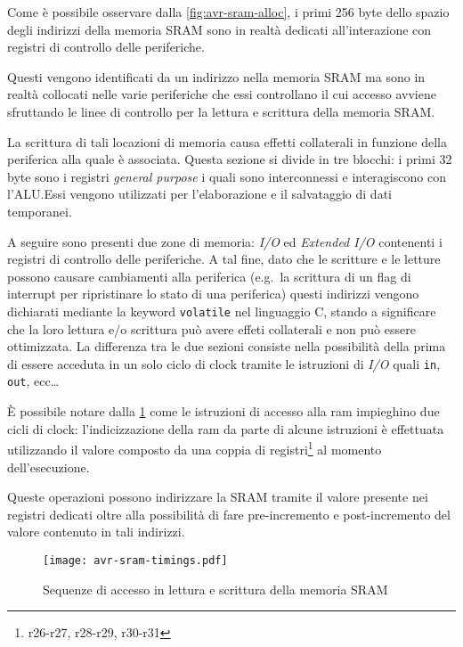 Come è possibile osservare dalla \cref{fig:avr-sram-alloc}, i primi 256 byte dello spazio degli indirizzi della memoria SRAM sono in realtà dedicati all'interazione con registri di controllo delle periferiche.

Questi vengono identificati da un indirizzo nella memoria SRAM ma sono in realtà collocati nelle varie periferiche che essi controllano il cui accesso avviene sfruttando le linee di controllo per la lettura e scrittura della memoria SRAM\cite[fig 14-2]{avr:m328p}.

La scrittura di tali locazioni di memoria causa effetti collaterali in funzione della periferica alla quale è associata. Questa sezione si divide in tre blocchi: i primi 32 byte sono i registri \textit{general purpose} i quali sono interconnessi e interagiscono con l'ALU.\@ Essi vengono utilizzati per l'elaborazione e il salvataggio di dati temporanei.

A seguire sono presenti due zone di memoria: \textit{I/O} ed \textit{Extended I/O} contenenti i registri di controllo delle periferiche. A tal fine, dato che le scritture e le letture possono causare cambiamenti alla periferica (e.g.\ la scrittura di un flag di interrupt per ripristinare lo stato di una periferica) questi indirizzi vengono dichiarati mediante la keyword \texttt{volatile} nel linguaggio C, stando a significare che la loro lettura e/o scrittura può avere effeti collaterali e non può essere ottimizzata. La differenza tra le due sezioni consiste nella possibilità della prima di essere acceduta in un solo ciclo di clock tramite le istruzioni di \textit{I/O}\cite[sec 8.5]{avr:m328p} quali \texttt{in}, \texttt{out}, ecc\ldots

È possibile notare dalla \cref{fig:avr-sram-timings} come le istruzioni di accesso alla ram impieghino due cicli di clock: l'indicizzazione della ram da parte di alcune istruzioni è effettuata utilizzando il valore composto da una coppia di registri\footnote{r26-r27, r28-r29, r30-r31} al momento dell'esecuzione. 

Queste operazioni possono indirizzare la SRAM tramite il valore presente nei registri dedicati oltre alla possibilità di fare pre-incremento e post-incremento del valore contenuto in tali indirizzi.

\begin{figure}[b]
    \centering
    \texttt{[image: avr-sram-timings.pdf]}
    \caption[Immagine rielaborata a partire dalla fig. 8-4 del documento~\cite{avr:m328p}]{Sequenze di accesso in lettura e scrittura della memoria SRAM\cite[fig 8-4]{avr:m328p}}\label{fig:avr-sram-timings}
\end{figure}

